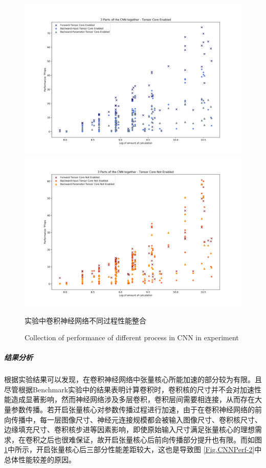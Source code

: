 \begin{figure}
	\centering
	\includegraphics[width=15cm]{figures/CNN-HALF-3PART-TF.jpg}\\
	\includegraphics[width=15cm]{figures/CNN-HALF-3PART-NOTF.jpg}
	\renewcommand{\thefigure}{\arabic{section}-\arabic{figure} }
	\renewcommand{\figurename}{图}
	\caption{实验中卷积神经网络不同过程性能整合}
	\addtocounter{figure}{-1}
	\renewcommand{\thefigure}{\arabic{section}-\arabic{figure} }
	\renewcommand{\figurename}{Figure}
	\caption{Collection of performance of different process in CNN in experiment}
	\label{Fig.CNNPerf3Part}
\end{figure}
\subparagraph{结果分析}
\par 根据实验结果可以发现，在卷积神经网络中张量核心所能加速的部分较为有限。且尽管根据Benchmark实验中的结果表明计算卷积时，卷积核的尺寸并不会对加速性能造成显著影响，然而神经网络涉及多层卷积，卷积层间需要相连接，从而存在大量参数传播。若开启张量核心对参数传播过程进行加速，由于在卷积神经网络的前向传播中，每一层图像尺寸、神经元连接规模都会被输入图像尺寸、卷积核尺寸、边缘填充尺寸、卷积核步进等因素影响，即使原始输入尺寸满足张量核心的理想需求，在卷积之后也很难保证，故开启张量核心后前向传播部分提升也有限。而如图 \ref{Fig.CNNPerf3Part}中所示，开启张量核心后三部分性能差距较大，这也是导致图 \ref{Fig.CNNPerf-2}中总体性能较差的原因。
